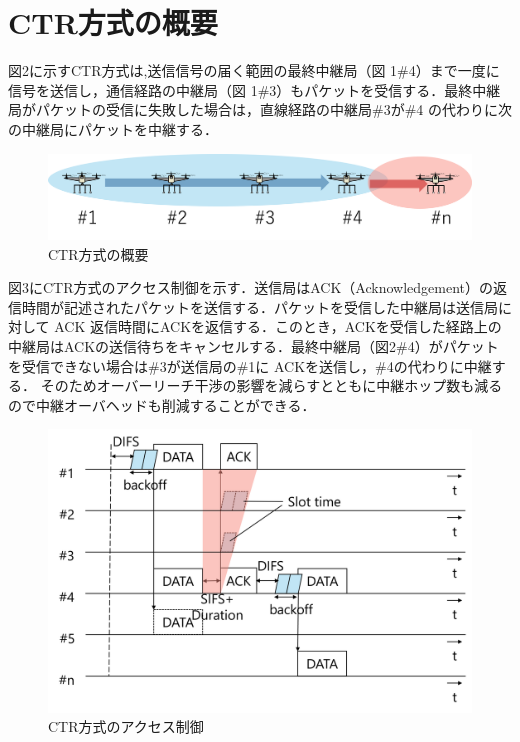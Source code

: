 \documentclass[a4paper,10pt]{ltjsarticle}
\begin{document}
\section{CTR方式の概要}
図2に示すCTR方式は,送信信号の届く範囲の最終中継局（図 1\#4）まで一度に信号を送信し，通信経路の中継局（図 1\#3）もパケットを受信する．最終中継局がパケットの受信に失敗した場合は，直線経路の中継局\#3が\#4 の代わりに次の中継局にパケットを中継する．
\begin{figure}[htbp]
  \centering
  \includegraphics[width=\linewidth]{CTR_topology.png} %
  \caption{CTR方式の概要}
  \label{fig:CTR方式のトポロジー} %
\end{figure}
図3にCTR方式のアクセス制御を示す．送信局はACK（Acknowledgement）の返信時間が記述されたパケットを送信する．パケットを受信した中継局は送信局に対して ACK 返信時間にACKを返信する．このとき，ACKを受信した経路上の中継局はACKの送信待ちをキャンセルする．最終中継局（図2\#4）がパケット を受信できない場合は\#3が送信局の\#1に ACKを送信し，\#4の代わりに中継する．
そのためオーバーリーチ干渉の影響を減らすとともに中継ホップ数も減るので中継オーバヘッドも削減することができる．
\begin{figure}[htbp]
  \centering
  \includegraphics[width=\linewidth]{CTR_accsess.png} %
  \caption{CTR方式のアクセス制御}
  \label{fig:CTR方式のアクセス制御} %
\end{figure}
\end{document}
